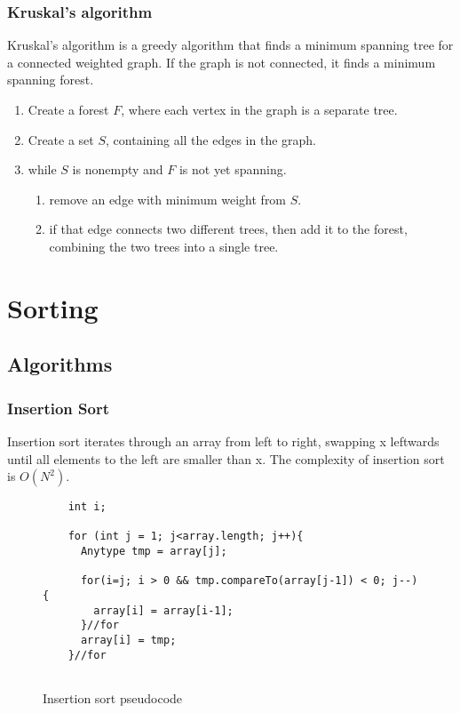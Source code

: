 \documentclass[paper=a4, fontsize=11pt]{scrartcl}
\numberwithin{equation}{section} %
\numberwithin{figure}{section} %
\numberwithin{table}{section} %
\theoremstyle{definition}
\begin{document}
\subsubsection{Kruskal's algorithm}
Kruskal's algorithm is a greedy algorithm that finds a minimum spanning tree
for a connected weighted graph.  If the graph is not connected, it finds a
minimum spanning forest.

\begin{enumerate}
  \item Create a forest \(F\), where each vertex in the graph is a separate tree.
  \item Create a set \(S\), containing all the edges in the graph.
  \item while \(S\) is nonempty and \(F\) is not yet spanning.
    \begin{enumerate}
      \item remove an edge with minimum weight from \(S\).
      \item if that edge connects two different trees, then add it to the forest, combining the two trees into a single tree.
    \end{enumerate}
\end{enumerate}

\section{Sorting}

\subsection{Algorithms}

\subsubsection{Insertion Sort}
Insertion sort iterates through an array from left to right, swapping x leftwards until all elements to the left are smaller than x. 
The complexity of insertion sort is $O(N^2)$.


\begin{figure}[p]
  \begin{verbatim}
    int i;
    
    for (int j = 1; j<array.length; j++){
      Anytype tmp = array[j];
      
      for(i=j; i > 0 && tmp.compareTo(array[j-1]) < 0; j--){
        array[i] = array[i-1];
      }//for
      array[i] = tmp;
    }//for
  
  \end{verbatim}
  \caption{Insertion sort pseudocode}
\end{figure}
\end{document}
